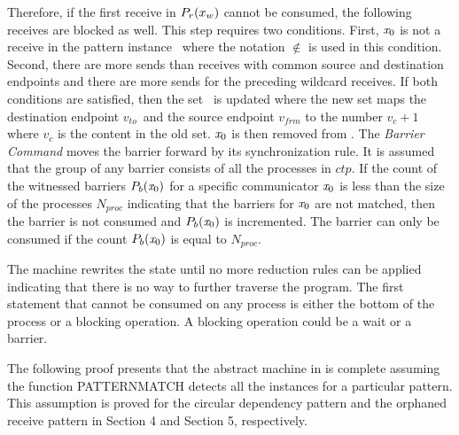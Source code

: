 Therefore, if the first receive in $\textit{$P_r$}(x_w)$ cannot be consumed, the following receives are blocked as well. 
This step requires two conditions. First, $\mathit{x}_0$ is not a receive in the pattern instance \rcvp\ where the notation $\notin$ is used in this condition. Second, there are more sends than receives with common source and destination endpoints and there are more sends for the preceding wildcard receives. If both conditions are satisfied, then the set \eprcv\ is updated where the new set maps the destination endpoint $v_{to}$\ and the source endpoint $v_{frm}$ to the number $v_c + 1$ where $v_c$ is the content in the old set. $\mathit{x}_0$ is then removed from \epwait. 
The \emph{Barrier Command} moves the barrier forward by its synchronization rule. It is assumed that the group of any barrier consists of all the processes in $\mathit{ctp}$. 
If the count of the witnessed barriers $\textit{$P_b$}(\mathit{x}_0)$ for a specific communicator $\mathit{x}_0$ is less than the size of the processes $N_{proc}$ indicating that the barriers for $\mathit{x}_0$ are not matched, then the barrier is not consumed and $\textit{$P_b$}(\mathit{x}_0)$ is incremented. The barrier can only be consumed if the count $\textit{$P_b$}(\mathit{x}_0)$ is equal to $N_{proc}$.

The machine rewrites the state until no more reduction rules can be applied indicating that there is no way to further traverse the program. The first statement that cannot be consumed on any process is either the bottom of the process or a blocking operation. A blocking operation could be a wait or a barrier. 

The following proof presents that the abstract machine in  is complete assuming the function \textrm{PATTERNMATCH} detects all the instances for a particular pattern. This assumption is proved for the circular dependency pattern and the orphaned receive pattern in Section 4 and Section 5, respectively. 

